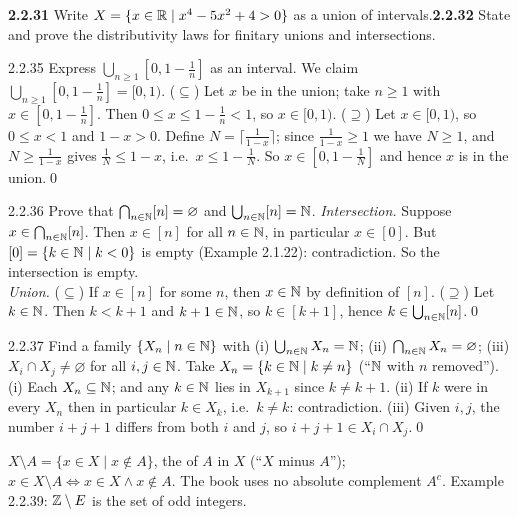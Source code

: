 \begin{trybox}[{2.2.31, 2.2.32 \fO}]
\textbf{2.2.31} Write $X=\{x\in\mathbb{R}\mid x^4-5x^2+4>0\}$ as a union of intervals.\quad \textbf{2.2.32} State and prove the distributivity laws for finitary unions and intersections.
\end{trybox}

\begin{bookex}[essential]{2.2.35}
Express $\bigcup_{n\ge1}[0,1-\frac1n]$ as an interval.
\solution
We claim $\bigcup_{n\ge1}[0,1-\frac1n]=[0,1)$. ($\subseteq$) Let $x$ be in the union; take $n\ge1$ with $x\in[0,1-\frac1n]$. Then $0\le x\le1-\frac1n<1$, so $x\in[0,1)$. ($\supseteq$) Let $x\in[0,1)$, so $0\le x<1$ and $1-x>0$. Define $N=\lceil\frac1{1-x}\rceil$; since $\frac1{1-x}\ge1$ we have $N\ge1$, and $N\ge\frac1{1-x}$ gives $\frac1N\le1-x$, i.e.\ $x\le1-\frac1N$. So $x\in[0,1-\frac1N]$ and hence $x$ is in the union.\qed
\end{bookex}

\begin{bookex}[essential]{2.2.36}
Prove that $\bigcap_{n\in\mathbb{N}}[n]=\varnothing$ and $\bigcup_{n\in\mathbb{N}}[n]=\mathbb{N}$.
\solution
\emph{Intersection.} Suppose $x\in\bigcap_{n\in\mathbb{N}}[n]$. Then $x\in[n]$ for all $n\in\mathbb{N}$, in particular $x\in[0]$. But $[0]=\{k\in\mathbb{N}\mid k<0\}$ is empty (Example 2.1.22): contradiction. So the intersection is empty.\\
\emph{Union.} ($\subseteq$) If $x\in[n]$ for some $n$, then $x\in\mathbb{N}$ by definition of $[n]$. ($\supseteq$) Let $k\in\mathbb{N}$. Then $k<k+1$ and $k+1\in\mathbb{N}$, so $k\in[k+1]$, hence $k\in\bigcup_{n\in\mathbb{N}}[n]$.\qed
\end{bookex}

\begin{bookex}[essential]{2.2.37}
Find a family $\{X_n\mid n\in\mathbb{N}\}$ with (i) $\bigcup_{n\in\mathbb{N}}X_n=\mathbb{N}$; (ii) $\bigcap_{n\in\mathbb{N}}X_n=\varnothing$; (iii) $X_i\cap X_j\ne\varnothing$ for all $i,j\in\mathbb{N}$.
\solution
Take $X_n=\{k\in\mathbb{N}\mid k\ne n\}$ (``$\mathbb{N}$ with $n$ removed''). (i) Each $X_n\subseteq\mathbb{N}$; and any $k\in\mathbb{N}$ lies in $X_{k+1}$ since $k\ne k+1$. (ii) If $k$ were in every $X_n$ then in particular $k\in X_k$, i.e.\ $k\ne k$: contradiction. (iii) Given $i,j$, the number $i+j+1$ differs from both $i$ and $j$, so $i+j+1\in X_i\cap X_j$.\qed
\end{bookex}

\begin{key}[{Definition 2.2.38}]
$X\setminus A=\{x\in X\mid x\notin A\}$, the  of $A$ in $X$ (``$X$ minus $A$''); $x\in X\setminus A\Leftrightarrow x\in X\wedge x\notin A$. The book uses no absolute complement $A^c$. Example 2.2.39: $\mathbb{Z}\setminus E$ is the set of odd integers.
\end{key}

